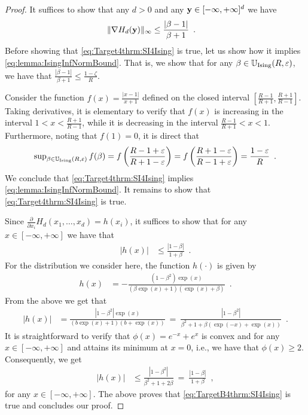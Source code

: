 \documentclass[11pt,reqno]{amsart}
\numberwithin{equation}{section}
\newcommand{\blue}[1]{{\color{blue}#1}}
\newcommand{\capri}[1]{{\color{capri}#1}}
\newcommand{\goldenbrown}[1]{{\color{goldenbrown}#1}}
\newcommand{\heliotrope}[1]{{\color{heliotrope}#1}}
\newcommand{\UnIsing}{{\mathbb{U}_{\rm Ising}}}
\newcommand{\logtrecur}{H}
\newcommand{\dlogtrecur}{h}
\newcommand{\norm}[2]{\goldenbrown{\|} #1 \goldenbrown{\|}_{#2}}
\newcommand{\abs}[1]{\blue{|}#1\blue{|}}
\renewcommand{\blue}[1]{#1}
\renewcommand{\capri}[1]{#1}
\renewcommand{\goldenbrown}[1]{#1}
\renewcommand{\heliotrope}[1]{#1}
\newcommand{\ki}{\capri{i}}
\newcommand{\kx}{\heliotrope{x}}
\renewcommand{\ki}{i}
\renewcommand{\kx}{x}
\begin{document}
\begin{proof}
% 
It suffices to show that any $d>0$ and any 
${\bf y}\in [-\infty, +\infty]^d$ we have 
\begin{align}\label{eq:Target4thrm:SI4Ising}
\norm{\nabla \logtrecur_d ({\bf y})}{\infty}
&\leq \frac{|\beta-1|}{\beta +1} \enspace.
\end{align}
Before showing that \eqref{eq:Target4thrm:SI4Ising} is true, let us show how it implies 
\eqref{eq:lemma:IsingInfNormBound}. That is, we show that for any $\beta \in \UnIsing(R,\varepsilon)$,
we have that $\frac{|\beta-1|}{\beta +1}\leq \frac{1-\zeta}{R}$.

Consider the function $f(\kx)=\frac{|\kx-1|}{\kx+1}$ defined on the closed interval 
$\left[\frac{R-1}{R+1}, \frac{R+1}{R-1} \right]$. 
Taking derivatives, it is elementary to verify that $f(\kx)$ is increasing in the interval 
$1< \kx < \frac{R+1}{R-1}$, while it is decreasing in the interval $\frac{R-1}{R+1}< \kx <1$. 
%
Furthermore, noting that $f(1)=0$, it is direct that 
{\small
\begin{align}\nonumber
\sup\nolimits_{\beta \in \UnIsing(R,\varepsilon)}f(\beta)= 
f\left(\frac{R-1+\varepsilon}{R+1-\varepsilon}\right)= f\left(\frac{R+1-\varepsilon}{R-1+\varepsilon}\right)
=\frac{1-\varepsilon}{R} \enspace.
\end{align}
}
We conclude that \eqref{eq:Target4thrm:SI4Ising} implies \eqref{eq:lemma:IsingInfNormBound}.
It remains to show that \eqref{eq:Target4thrm:SI4Ising} is true.

Since $\frac{\partial }{\partial \kx_{\ki}}\logtrecur_d(\kx_1, \ldots, \kx_d)=\dlogtrecur(\kx_{\ki})$, 
it suffices to show that for any $\kx\in [-\infty, +\infty]$ we have that
{\small 
\begin{align}\label{eq:TargetB4thrm:SI4Ising}
\abs{ \dlogtrecur(\kx)} &\leq \frac{\abs{1-\beta } }{1+\beta} \enspace.
\end{align}
}
For the distribution we consider here, the function $\dlogtrecur(\cdot)$ is given by 
\begin{align}%
\dlogtrecur(\kx) & =-\frac{(1-\beta^2) \exp(\kx)}{(\beta \exp(\kx)+1)(\exp(\kx)+\beta)} \enspace.
\end{align}
%
From the above we get that
{\small
\begin{align}
\abs{\dlogtrecur(\kx)} & = \frac{\abs{1-\beta^2}\exp(\kx)}{(b \exp(\kx) +1)(b+ \exp(\kx))} \ =
% 
\ \frac{\abs{1-\beta^2 }}{\beta^2+1 +\beta (\exp(-\kx)+\exp(\kx) ) } \enspace. \nonumber
\end{align}
}
It is straightforward to verify that $\phi(\kx)=e^{-\kx}+e^{\kx}$ is convex and for any $\kx\in [-\infty, +\infty]$
and attains its minimum at $\kx=0$, i.e., we have that $\phi(\kx)\geq 2$. Consequently, we get 
%
{\small 
\begin{align} \nonumber 
\abs{\dlogtrecur(\kx)} & \leq \frac{\abs{1-\beta^2}}{\beta^2+1 +2\beta } \ = \   \frac{\abs{1-\beta}}{1+\beta} \enspace,
\end{align}
}
for any $\kx\in [-\infty, +\infty]$.
The above proves that \eqref{eq:TargetB4thrm:SI4Ising} is true and concludes our proof.
\end{proof}
\end{document}
